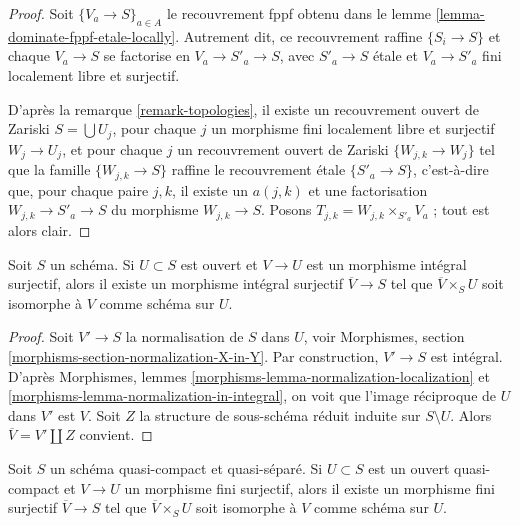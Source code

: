 \begin{proof}
Soit $\{V_a \to S\}_{a \in A}$ le recouvrement fppf obtenu dans le
lemme \ref{lemma-dominate-fppf-etale-locally}.
Autrement dit, ce recouvrement raffine
$\{S_i \to S\}$
et chaque $V_a \to S$ se factorise en
$V_a \to S'_a \to S$, avec $S'_a \to S$ \'etale et $V_a \to S'_a$
fini localement libre et surjectif.

\medskip\noindent
D'après la
remarque \ref{remark-topologies},
il existe un recouvrement ouvert de Zariski $S = \bigcup U_j$,
pour chaque $j$ un morphisme fini localement libre et surjectif
$W_j \to U_j$, et pour chaque $j$ un recouvrement ouvert de Zariski
$\{W_{j, k} \to W_j\}$ tel que la famille
$\{W_{j, k} \to S\}$ raffine le recouvrement \'etale
$\{S'_a \to S\}$, c'est-à-dire que, pour chaque paire $j, k$, il existe
un $a(j, k)$ et une factorisation $W_{j, k} \to S'_a \to S$
du morphisme $W_{j, k} \to S$. Posons
$T_{j, k} = W_{j, k} \times_{S'_a} V_a$ ; tout est alors clair.
\end{proof}

\begin{lemma}
\label{lemma-extend-integral-surjective-morphisms}
Soit $S$ un schéma. Si $U \subset S$ est ouvert et $V \to U$ est un morphisme
intégral surjectif, alors il existe un morphisme intégral surjectif
$\overline{V} \to S$ tel que $\overline{V} \times_S U$ soit
isomorphe à $V$ comme schéma sur $U$.
\end{lemma}

\begin{proof}
Soit $V' \to S$ la normalisation de $S$ dans $U$, voir
Morphismes, section \ref{morphisms-section-normalization-X-in-Y}.
Par construction, $V' \to S$ est intégral.
D'après Morphismes, lemmes \ref{morphisms-lemma-normalization-localization} et
\ref{morphisms-lemma-normalization-in-integral}, on voit que
l'image réciproque de $U$ dans $V'$ est $V$. Soit $Z$ la structure de sous-schéma réduit
induite sur $S \setminus U$. Alors
$\overline{V} = V' \amalg Z$ convient.
\end{proof}

\begin{lemma}
\label{lemma-extend-finite-surjective-morphisms}
Soit $S$ un schéma quasi-compact et quasi-séparé.
Si $U \subset S$ est un ouvert quasi-compact
et $V \to U$ un morphisme fini surjectif, alors il existe un
morphisme fini surjectif $\overline{V} \to S$ tel que $\overline{V} \times_S U$
soit isomorphe à $V$ comme schéma sur $U$.
\end{lemma}

